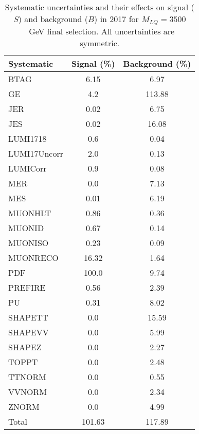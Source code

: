 \begin{table}[htbp]
\begin{center}
\caption{Systematic uncertainties and their effects on signal ($S$) and background ($B$) in 2017 for $M_{LQ}=3500$~GeV final selection. All uncertainties are symmetric.}
\begin{tabular}{lcc}
\hline\hline
Systematic & Signal (\%) & Background (\%) \\ \hline 
BTAG & 6.15 & 6.97\\ 
GE & 4.2 & 113.88\\ 
JER & 0.02 & 6.75\\ 
JES & 0.02 & 16.08\\ 
LUMI1718 & 0.6 & 0.04\\ 
LUMI17Uncorr & 2.0 & 0.13\\ 
LUMICorr & 0.9 & 0.08\\ 
MER & 0.0 & 7.13\\ 
MES & 0.01 & 6.19\\ 
MUONHLT & 0.86 & 0.36\\ 
MUONID & 0.67 & 0.14\\ 
MUONISO & 0.23 & 0.09\\ 
MUONRECO & 16.32 & 1.64\\ 
PDF & 100.0 & 9.74\\ 
PREFIRE & 0.56 & 2.39\\ 
PU & 0.31 & 8.02\\ 
SHAPETT & 0.0 & 15.59\\ 
SHAPEVV & 0.0 & 5.99\\ 
SHAPEZ & 0.0 & 2.27\\ 
TOPPT & 0.0 & 2.48\\ 
TTNORM & 0.0 & 0.55\\ 
VVNORM & 0.0 & 2.34\\ 
ZNORM & 0.0 & 4.99\\ 
Total & 101.63 & 117.89\\ \hline \hline
\end{tabular}
\label{tab:SysUncertainties_uujj_3500}
\end{center}
\end{table}

